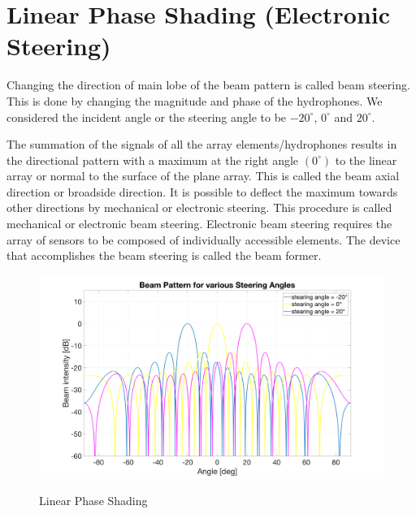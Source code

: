 \section{ Linear Phase Shading (Electronic Steering) } \label{ Linear Phase Shading (Electronic Steering) } 
\noindent Changing the direction of main lobe of the beam pattern is called beam steering. This is done by
changing the magnitude and phase of the hydrophones. We considered the incident angle or the steering angle to be $-20^{\circ}$, $0^{\circ}$ and $20^{\circ}$.

\noindent The summation of the signals of all the array elements/hydrophones results in the directional pattern with a maximum at the right angle $(0^{\circ})$ to the linear array or normal to the surface of the plane array. This is called the beam axial direction or broadside direction. It is possible to deflect the maximum towards other directions by mechanical or electronic steering. This procedure is called mechanical or electronic beam steering. Electronic beam steering requires the array of sensors to be composed of individually accessible elements. The device that
accomplishes the beam steering is called the beam former.
\begin{figure}[H]
\centering
{\includegraphics[scale=0.1]{usp7_9.png}}
\caption{ Linear Phase Shading }
\end{figure}

